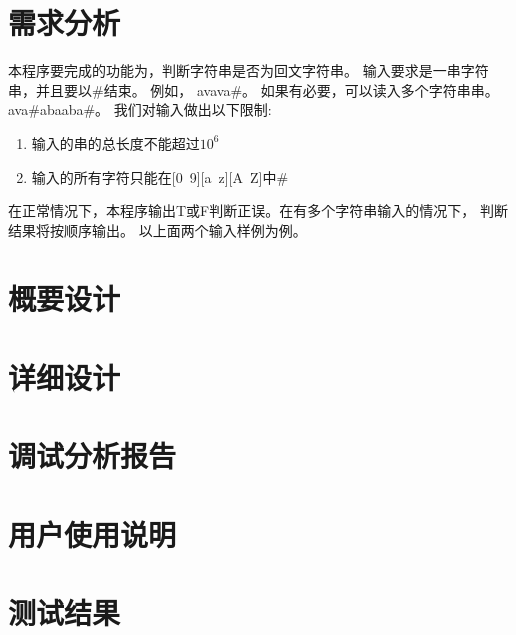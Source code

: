\section{需求分析}

本程序要完成的功能为，判断字符串是否为回文字符串。
输入要求是一串字符串，并且要以\#结束。
例如，
avava\#。
如果有必要，可以读入多个字符串串。
ava\#abaaba\#。
我们对输入做出以下限制:
\begin{enumerate}
   \item 输入的串的总长度不能超过$10^6$
   \item 输入的所有字符只能在[0~9][a~z][A~Z]中\#
\end{enumerate}


在正常情况下，本程序输出T或F判断正误。在有多个字符串输入的情况下，
判断结果将按顺序输出。
以上面两个输入样例为例。



\section{概要设计}

\section{详细设计}

\section{调试分析报告}

\section{用户使用说明}

\section{测试结果}


